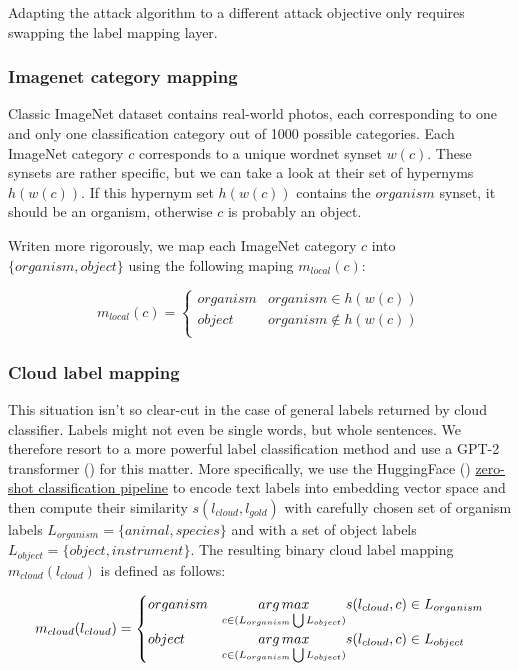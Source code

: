 Adapting the attack algorithm to a different attack objective only requires swapping the label mapping layer.

\subsubsection{Imagenet category mapping}
Classic ImageNet dataset contains real-world photos, each corresponding to one and only one classification category out of 1000 possible categories. Each ImageNet category $c$ corresponds to a unique wordnet synset $w(c)$. These synsets are rather specific, but we can take a look at their set of hypernyms $h(w(c))$. If this hypernym set $h(w(c))$ contains the $organism$ synset, it should be an organism, otherwise $c$ is probably an object. 

Writen more rigorously, we map each ImageNet category $c$ into $\{organism, object\}$ using the following maping $m_{local}(c)$:

\[ m_{local}(c) = \begin{cases} 
      organism & organism \in h(w(c)) \\
      object & organism \notin h(w(c)) \\
   \end{cases}
\]


\subsubsection{Cloud label mapping}
This situation isn't so clear-cut in the case of general labels returned by cloud classifier. Labels might not even be single words, but whole sentences. We therefore resort to a more powerful label classification method and use a GPT-2 transformer (\cite{radford2019language}) for this matter. More specifically, we use the HuggingFace (\cite{wolf2020huggingfaces}) \href{https://joeddav.github.io/blog/2020/05/29/ZSL.html}{zero-shot classification pipeline} to encode text labels into embedding vector space and then compute their similarity $s(l_{cloud}, l_{gold})$ with carefully chosen set of organism labels $L_{organism} = \{animal, species\}$ and with a set of object labels $L_{object} = \{object, instrument\}$. The resulting binary cloud label mapping $m_{cloud}(l_{cloud})$ is defined as follows:

\[ m_{cloud}(l_{cloud}) = \begin{cases} 
      organism & \underset{c \in (L_{organism} \bigcup L_{object})}{arg\,max} s(l_{cloud}, c) \in L_{organism} \\
      object & \underset{c \in (L_{organism} \bigcup L_{object})}{arg\,max} s(l_{cloud}, c) \in L_{object} \\
   \end{cases}
\]

